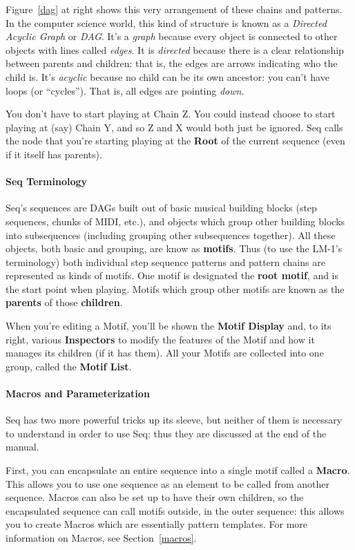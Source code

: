 \documentclass[twoside,10pt]{article}
\begin{document}
Figure~\ref{dag} at right shows this very arrangement of these chains and patterns. In the computer science world, this kind of structure is known as a {\it Directed Acyclic Graph} or {\it DAG}.  It's a {\it graph} because every object is connected to other objects with lines called {\it edges}.  It is {\it directed} because there is a clear relationship between parents and children: that is, the edges are arrows indicating who the child is.  It's {\it acyclic} because no child can be its own ancestor: you can't have loops (or ``cycles'').  That is, all edges are pointing {\it down}.

You don't have to start playing at Chain Z.  You could instead choose to start playing at (say) Chain Y, and so Z and X would both just be ignored.  Seq calls the node that you're starting playing at the {\bf Root} of the current sequence (even if it itself has parents).

\paragraph{Seq Terminology}

Seq's sequences are DAGs built out of basic musical building blocks (step sequences, chunks of MIDI, etc.), and objects which group other building blocks into subsequences (including grouping other subsequences together).  All these objects, both basic and grouping, are know as {\bf motifs}.  Thus (to use the LM-1's terminology) both individual step sequence patterns and pattern chains are represented as kinds of motifs.  One motif is designated the {\bf root motif}, and is the start point when playing.  Motifs which group other motifs are known as the {\bf parents} of those {\bf children}.  

When you're editing a Motif, you'll be shown the {\bf Motif Display} and, to its right, various {\bf Inspectors} to modify the features of the Motif and how it manages its children (if it has them).  All your Motifs are collected into one group, called the {\bf Motif List}.

\paragraph{Macros and Parameterization}

Seq has two more powerful tricks up its sleeve, but neither of them is necessary to understand in order to use Seq: thus they are discussed at the end of the manual.

First, you can encapsulate an entire sequence into a single motif called a {\bf Macro}.  This allows you to use one sequence as an element to be called from another sequence.  Macros can also be set up to have their own children, so the encapsulated sequence can call motifs outside, in the outer sequence: this allows you to create Macros which are essentially pattern templates.  For more information on Macros, see Section~\ref{macros}.
\end{document}
